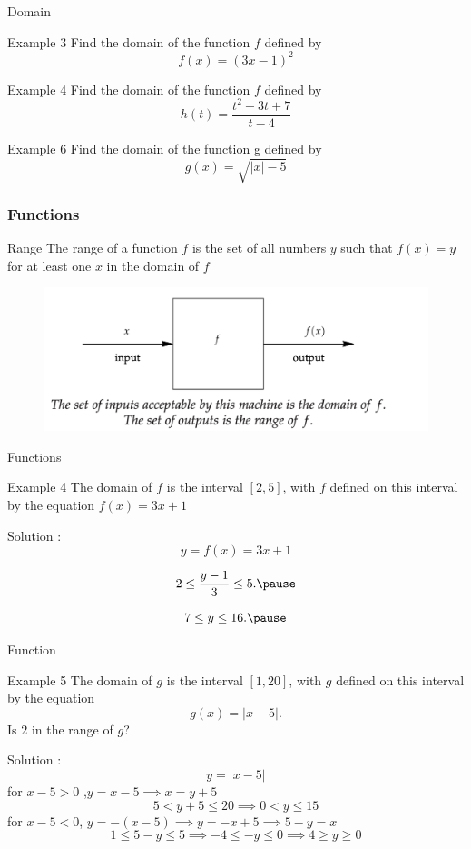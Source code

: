 \documentclass{beamer}
\begin{document}
\begin{frame}{Domain}
  \begin{exampleblock}{Example 3}
    Find the domain of the function \(f\)  defined by \[f (x) = (3x-1)^2 \]
  \end{exampleblock}
  \begin{exampleblock}{Example 4}
    Find the domain of the function \(f\) defined by \[h (t) = \frac{t^2 + 3t + 7}{t-4} \]
  \end{exampleblock}
  \begin{exampleblock}{Example 6}
    Find the domain of the function g defined by \[g(x) = \sqrt{|x|-5}\]
  \end{exampleblock}
\end{frame}
\begin{frame}
  \frametitle{Functions}
  \begin{block}{Range}
    The range of a function \(f\) is the set of all numbers \(y\) such that \(f (x) = y\) for at least one \(x\) in the domain of \(f\)
  \end{block}
  \begin{figure}[h]    
    \centering
    \includegraphics[scale=0.5]{function-engine.png}
\end{figure}
\end{frame}
\begin{frame}{Functions}
  \begin{exampleblock}{Example 4}
The domain of \(f\) is the interval \( [2, 5] \), with \(f\) defined on this interval by the equation \(f (x) = 3x + 1\)
  \end{exampleblock}
  Solution : \pause 
  \[
  y = f(x) = 3x+1 \]     \pause

  \[  2 \leq \frac{y-1}{3} \leq 5.  \pause
  \]

  \[  7 \leq y \leq 16.   \pause
   \]
\end{frame}
\begin{frame}{Function}
  \begin{exampleblock}{Example 5}
    The domain of \(g\) is the interval \([1,20]\), with \(g\) defined on this interval by
    the equation
    \[
    g(x) = |x - 5|.
    \]
    Is \(2\) in the range of \(g\)?
  \end{exampleblock}
  Solution :  \pause 
  \[ y =  |x-5| \]
  for \(x-5>0 \) ,\(y = x-5 \implies x = y+5 \)  
  \[ 5 < y+5 \leq 20  \implies  0 < y \leq 15 \]
  for \(x-5<0 \), \(y = -(x-5) \implies y = -x+5 \implies 5-y = x \)
  \[ 1 \leq 5-y \leq 5  \implies -4 \leq -y \leq 0 \implies  4 \geq y \geq 0 \] 
\end{frame}
\end{document}
